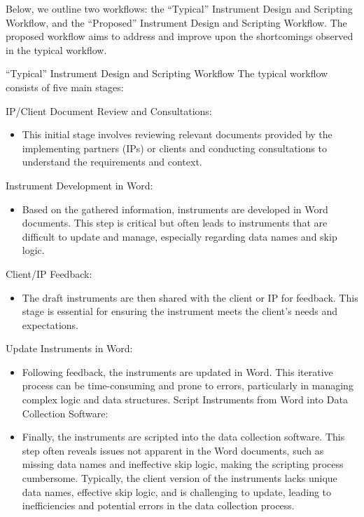 \documentclass[
  letterpaper,
  DIV=11,
  numbers=noendperiod]{scrreprt}
\providecommand{\tightlist}{%
  \setlength{\itemsep}{0pt}\setlength{\parskip}{0pt}}\usepackage{longtable,booktabs,array}
\begin{document}
Below, we outline two workflows: the ``Typical'' Instrument Design and
Scripting Workflow, and the ``Proposed'' Instrument Design and Scripting
Workflow. The proposed workflow aims to address and improve upon the
shortcomings observed in the typical workflow.

``Typical'' Instrument Design and Scripting Workflow The typical
workflow consists of five main stages:

IP/Client Document Review and Consultations:

\begin{itemize}
\tightlist
\item
  This initial stage involves reviewing relevant documents provided by
  the implementing partners (IPs) or clients and conducting
  consultations to understand the requirements and context.
\end{itemize}

Instrument Development in Word:

\begin{itemize}
\tightlist
\item
  Based on the gathered information, instruments are developed in Word
  documents. This step is critical but often leads to instruments that
  are difficult to update and manage, especially regarding data names
  and skip logic.
\end{itemize}

Client/IP Feedback:

\begin{itemize}
\tightlist
\item
  The draft instruments are then shared with the client or IP for
  feedback. This stage is essential for ensuring the instrument meets
  the client's needs and expectations.
\end{itemize}

Update Instruments in Word:

\begin{itemize}
\item
  Following feedback, the instruments are updated in Word. This
  iterative process can be time-consuming and prone to errors,
  particularly in managing complex logic and data structures. Script
  Instruments from Word into Data Collection Software:
\item
  Finally, the instruments are scripted into the data collection
  software. This step often reveals issues not apparent in the Word
  documents, such as missing data names and ineffective skip logic,
  making the scripting process cumbersome. Typically, the client version
  of the instruments lacks unique data names, effective skip logic, and
  is challenging to update, leading to inefficiencies and potential
  errors in the data collection process.
\end{itemize}
\end{document}
